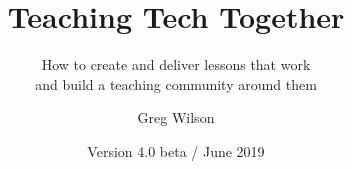 \documentclass[nemilov1]{Nemilov}
\begin{document}
\title{Teaching Tech Together}
\subtitle{How to create and deliver lessons that work\\ and build a teaching community around them}
\author{Greg Wilson}
\date{Version 4.0 beta / June 2019}
\maketitle

\frontmatter

\tableofcontents


\mainmatter

















\cleardoublepage

\printbibliography

\appendix







\end{document}

